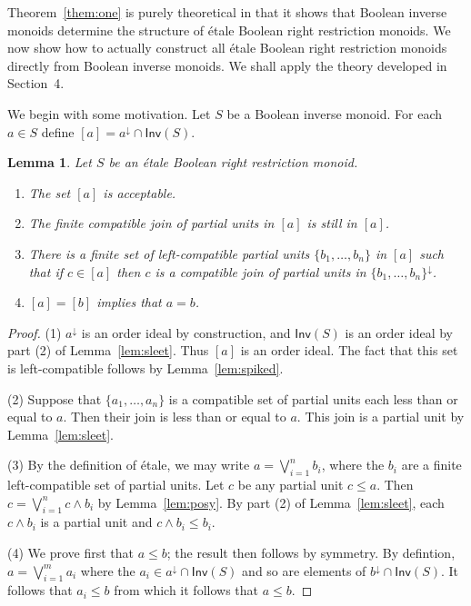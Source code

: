 \documentclass[a4paper]{amsart}
\newtheorem{lemma}[theorem]{Lemma}
\begin{document}
Theorem~\ref{them:one} is purely theoretical in that it shows that Boolean inverse monoids 
determine the structure of \'etale Boolean right restriction monoids.
We now show how to actually construct all \'etale Boolean right restriction monoids
directly from Boolean inverse monoids. 
We shall apply the theory developed in Section~4. 

We begin with some motivation.
Let $S$ be a Boolean inverse monoid.
For each $a \in S$ define $[a] = a^{\downarrow} \cap \mathsf{Inv}(S)$.


\begin{lemma}\label{lem:regis} Let $S$ be an \'etale Boolean right restriction monoid.
\begin{enumerate}
\item The set $[a]$ is acceptable.

\item The finite compatible join of partial units in $[a]$ is still in $[a]$.

\item There is a finite set of left-compatible partial units $\{b_{1},\ldots ,b_{n}\}$
in $[a]$ such that if $c \in [a]$ 
then $c$ is a compatible join of partial units in  $\{b_{1},\ldots ,b_{n}\}^{\downarrow}$.

\item $[a] = [b]$ implies that $a = b$.

\end{enumerate}
\end{lemma}
\begin{proof} (1) $a^{\downarrow}$ is an order ideal by construction,
and $\mathsf{Inv}(S)$ is an order ideal by part (2) of Lemma~\ref{lem:sleet}.
Thus  $[a]$ is an order ideal.
The fact that this set is left-compatible follows by Lemma~\ref{lem:spiked}.

(2) Suppose that $\{a_{1},\ldots, a_{n}\}$ is a compatible set of partial units each less
than or equal to $a$.
Then their join is less than or equal to $a$.
This join is a partial unit by Lemma~\ref{lem:sleet}.

(3) By the definition of \'etale, we may write $a = \bigvee_{i=1}^{n} b_{i}$,
where the $b_{i}$ are a finite left-compatible set of partial units.
Let $c$ be any partial unit $c \leq a$.
Then $c = \bigvee_{i=1}^{n} c \wedge b_{i}$ by Lemma~\ref{lem:posy}.
By part (2) of Lemma~\ref{lem:sleet}, each  $c \wedge b_{i}$ is a partial unit
and $c \wedge b_{i} \leq b_{i}$.

(4) We prove first that $a \leq b$;
the result then follows by symmetry.
By defintion, $a = \bigvee_{i=1}^{m} a_{i}$ where the $a_{i} \in a^{\downarrow} \cap \mathsf{Inv}(S)$
and so are elements of $b^{\downarrow} \cap \mathsf{Inv}(S)$.
It follows that $a_{i} \leq b$ from which it follows that $a \leq b$.
\end{proof}
\end{document}
